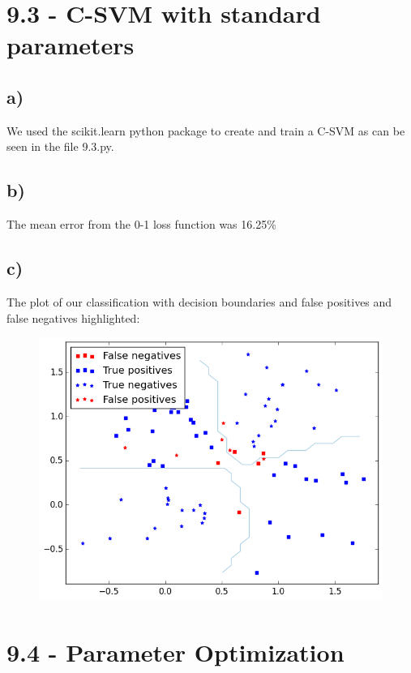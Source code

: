 \documentclass[11pt,a4paper]{article}
\begin{document}
\section*{9.3 - C-SVM with standard parameters}
\subsection*{a)}
We used the scikit.learn python package to create and train a C-SVM as can be seen in the file 9.3.py.
\subsection*{b)}
The mean error from the 0-1 loss function was 16.25\%
\subsection*{c)}
The plot of our classification with decision boundaries and false positives and false negatives highlighted:
\begin{figure}[h]
  \centering
  \includegraphics[width=\linewidth]{9_3.png}
\end{figure}

\section*{9.4 - Parameter Optimization}
\end{document}
